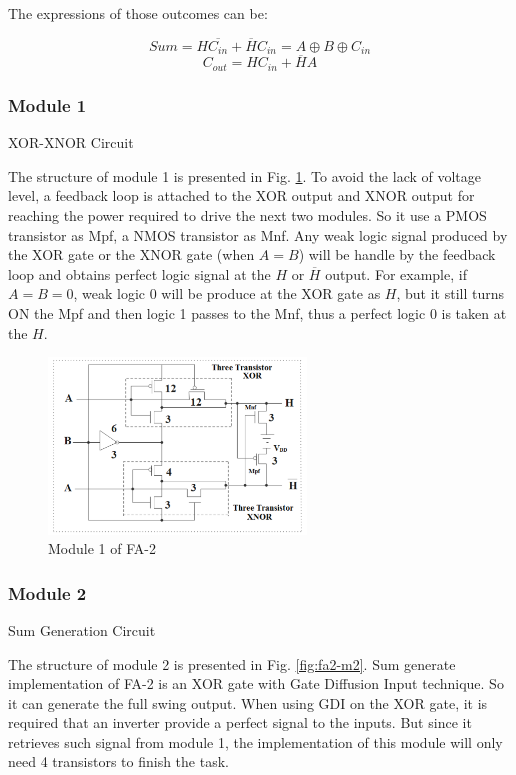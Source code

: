 \documentclass[conference]{IEEEtran}
\begin{document}
The expressions of those outcomes can be:

\[
	Sum = H\overline{C_{in}} + \overline{H}C_{in} = A \oplus B \oplus C_{in}
\]
\[
	C_{out} = HC_{in} + \overline{H}A
\]

\subsubsection{Module 1}XOR-XNOR Circuit

The structure of module 1 is presented in Fig. \ref{fig:fa2-m1}.
To avoid the lack of voltage level, a feedback loop is attached to the XOR output and XNOR output
for reaching the power required to drive the next two modules. So it use a PMOS transistor as Mpf, a NMOS transistor as Mnf.
Any weak logic signal produced by the XOR gate or the XNOR gate (when \(A=B\))
will be handle by the feedback loop and obtains perfect logic signal at the \(H\) or $\overline{H}$ output.
For example, if \(A = B = 0\), weak logic 0 will be produce at the XOR gate as \(H\),
but it still turns ON the Mpf and then logic 1 passes to the Mnf, thus a perfect logic 0 is taken at the \(H\).

\begin{figure}[!ht]
	\centering
	\includegraphics[width=2.7in]{fa2-m1.png}
	\caption{Module 1 of FA-2}
	\label{fig:fa2-m1}
\end{figure}

\subsubsection{Module 2} Sum Generation Circuit

The structure of module 2 is presented in Fig. \ref{fig:fa2-m2}.
Sum generate implementation of FA-2 is an XOR gate with Gate Diffusion Input technique.
So it can generate the full swing output.
When using GDI on the XOR gate, it is required that an inverter provide a perfect signal to the inputs.
But since it retrieves such signal from module 1, the implementation of this module will only need 4 transistors to finish the task.
\end{document}
